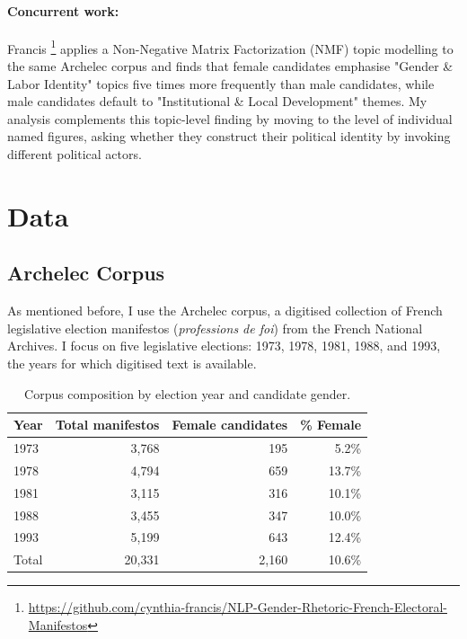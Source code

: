 \documentclass{article}
\begin{document}
\paragraph{Concurrent work:} Francis \cite{francis2026}\footnote{\url{https://github.com/cynthia-francis/NLP-Gender-Rhetoric-French-Electoral-Manifestos}} applies a Non-Negative Matrix Factorization (NMF) topic modelling to the same Archelec corpus and finds that female candidates emphasise "Gender \& Labor Identity" topics five times more frequently than male candidates, while male candidates default to "Institutional \& Local Development" themes. My analysis complements this topic-level finding by moving to the level of individual named figures, asking whether they construct their political identity by invoking different political actors.

\section{Data}

\subsection{Archelec Corpus}

As mentioned before, I use the Archelec corpus, a digitised collection of French legislative election manifestos (\emph{professions de foi}) from the French National Archives. I focus on five legislative elections: 1973, 1978, 1981, 1988, and 1993, the years for which digitised text is available. 

\begin{table}[h]
  \label{tab:corpus}
  \centering
  \begin{tabular}{lrrr}
    \toprule
    Year & Total manifestos & Female candidates & \% Female \\
    \midrule
    1973 & 3,768 & 195 & 5.2\% \\
    1978 & 4,794 & 659 & 13.7\% \\
    1981 & 3,115 & 316 & 10.1\% \\
    1988 & 3,455 & 347 & 10.0\% \\
    1993 & 5,199 & 643 & 12.4\% \\
    \midrule
    Total & 20,331 & 2,160 & 10.6\% \\
    \bottomrule
  \end{tabular}
\caption{Corpus composition by election year and candidate gender.}
\end{table}
\end{document}

